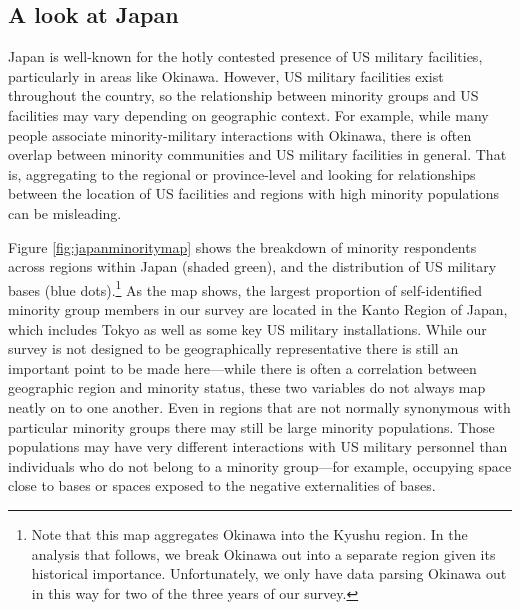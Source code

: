 \subsection*{A look at Japan}

Japan is well-known for the hotly contested presence of US military facilities, particularly in areas like Okinawa. However, US military facilities exist throughout the country, so the relationship between minority groups and US facilities may vary depending on geographic context. For example, while many people associate minority-military interactions with Okinawa, there is often overlap between minority communities and US military facilities in general. That is, aggregating to the regional or province-level and looking for relationships between the location of US facilities and regions with high minority populations can be misleading. 

Figure \ref{fig:japanminoritymap} shows the breakdown of minority respondents across regions within Japan (shaded green), and the distribution of US military bases (blue dots).\footnote{Note that this map aggregates Okinawa into the Kyushu region. In the analysis that follows, we break Okinawa out into a separate region given its historical importance. Unfortunately, we only have data parsing Okinawa out in this way for two of the three years of our survey.} As the map shows, the largest proportion of self-identified minority group members in our survey are located in the Kanto Region of Japan, which includes Tokyo as well as some key US military installations. While our survey is not designed to be geographically representative there is still an important point to be made here---while there is often a correlation between geographic region and minority status, these two variables do not always map neatly on to one another. Even in regions that are not normally synonymous with particular minority groups there may still be large minority populations. Those populations may have very different interactions with US military personnel than individuals who do not belong to a minority group—for example, occupying space close to bases or spaces exposed to the negative externalities of bases.


